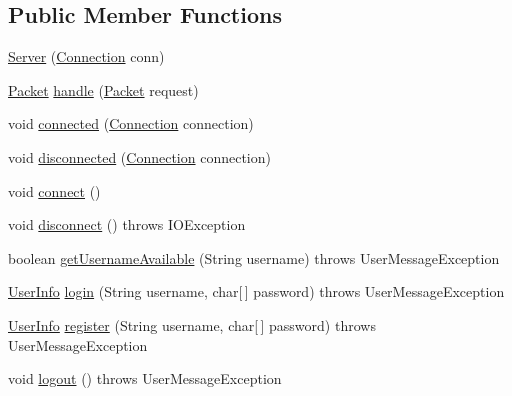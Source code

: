 \subsection*{Public Member Functions}
\begin{DoxyCompactItemize}
\item 
\hyperlink{classclient_1_1conn_1_1_server_aea9f06e94bc3d3653c06b192ba097a14}{Server} (\hyperlink{classpt_1_1up_1_1fe_1_1lpro1613_1_1sharedlib_1_1conn_1_1_connection}{Connection} conn)
\item 
\hyperlink{classpt_1_1up_1_1fe_1_1lpro1613_1_1sharedlib_1_1conn_1_1_packet}{Packet} \hyperlink{classclient_1_1conn_1_1_server_a620def50e5115d3798407dfff5433ead}{handle} (\hyperlink{classpt_1_1up_1_1fe_1_1lpro1613_1_1sharedlib_1_1conn_1_1_packet}{Packet} request)
\item 
void \hyperlink{classclient_1_1conn_1_1_server_ac8ad09c9052bfb32e082493ada8d14ab}{connected} (\hyperlink{classpt_1_1up_1_1fe_1_1lpro1613_1_1sharedlib_1_1conn_1_1_connection}{Connection} connection)
\item 
void \hyperlink{classclient_1_1conn_1_1_server_ae2a0ab226b1622da8e19137fb89bdc81}{disconnected} (\hyperlink{classpt_1_1up_1_1fe_1_1lpro1613_1_1sharedlib_1_1conn_1_1_connection}{Connection} connection)
\item 
void \hyperlink{classclient_1_1conn_1_1_server_a7e96a6bd486520d128a37a8216cf37c3}{connect} ()
\item 
void \hyperlink{classclient_1_1conn_1_1_server_ab69a81693f41986321e92120aa0918cb}{disconnect} ()  throws I\+O\+Exception 
\item 
boolean \hyperlink{classclient_1_1conn_1_1_server_ab25d4a9f33372c404d2464d1b608dd77}{get\+Username\+Available} (String username)  throws User\+Message\+Exception 
\item 
\hyperlink{classpt_1_1up_1_1fe_1_1lpro1613_1_1sharedlib_1_1structs_1_1_user_info}{User\+Info} \hyperlink{classclient_1_1conn_1_1_server_a064556a987ee40eb0a91a952ae08969f}{login} (String username, char\mbox{[}$\,$\mbox{]} password)  throws User\+Message\+Exception 
\item 
\hyperlink{classpt_1_1up_1_1fe_1_1lpro1613_1_1sharedlib_1_1structs_1_1_user_info}{User\+Info} \hyperlink{classclient_1_1conn_1_1_server_a945189dab00f6350cb5a444a910c4dd5}{register} (String username, char\mbox{[}$\,$\mbox{]} password)  throws User\+Message\+Exception 
\item 
void \hyperlink{classclient_1_1conn_1_1_server_af45689754d02a83d53602d01a9bf2427}{logout} ()  throws User\+Message\+Exception 

\end{DoxyCompactItemize}
